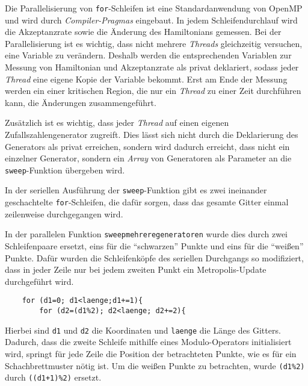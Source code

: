 	Die Parallelisierung von \texttt{for}-Schleifen ist eine Standardanwendung von OpenMP und wird durch \textit{Compiler-Pragmas} eingebaut. In jedem Schleifendurchlauf wird die Akzeptanzrate sowie die Änderung des Hamiltonians gemessen. Bei der Parallelisierung ist es wichtig, dass nicht mehrere \textit{Threads} gleichzeitig versuchen, eine Variable zu verändern. Deshalb werden die entsprechenden Variablen zur Messung von Hamiltonian und Akzeptanzrate als privat deklariert, sodass jeder \textit{Thread} eine eigene Kopie der Variable bekommt. Erst am Ende der Messung werden ein einer kritischen Region, die nur ein \textit{Thread} zu einer Zeit durchführen kann, die Änderungen zusammengeführt. 	%
	
	
	Zusätzlich ist es wichtig, dass jeder \textit{Thread} auf einen eigenen Zufallszahlengenerator zugreift. Dies lässt sich nicht durch die Deklarierung des Generators als privat erreichen, sondern wird dadurch erreicht, dass nicht ein einzelner Generator, sondern ein \textit{Array} von Generatoren als Parameter an die \texttt{sweep}-Funktion übergeben wird.
	
	In der seriellen Ausführung der \texttt{sweep}-Funktion gibt es zwei ineinander geschachtelte \texttt{for}-Schleifen, die dafür sorgen, dass das gesamte Gitter einmal zeilenweise durchgegangen wird.
	
	In der parallelen Funktion \texttt{sweepmehreregeneratoren} wurde dies durch zwei Schleifenpaare ersetzt, eins für die \enquote{schwarzen} Punkte und eins für die \enquote{weißen} Punkte.
	Dafür wurden die Schleifenköpfe des seriellen Durchgangs so modifiziert, dass in jeder Zeile nur bei jedem zweiten Punkt ein Metropolis-Update durchgeführt wird. 
	\begin{verbatim}
	for (d1=0; d1<laenge;d1+=1){
		for (d2=(d1%2); d2<laenge; d2+=2){
	\end{verbatim}
	Hierbei sind \texttt{d1} und \texttt{d2} die Koordinaten und \texttt{laenge} die Länge des Gitters. Dadurch, dass die zweite Schleife mithilfe eines Modulo-Operators initialisiert wird, springt für jede Zeile die Position der betrachteten Punkte, wie es für ein Schachbrettmuster nötig ist. Um die weißen Punkte zu betrachten, wurde \texttt{(d1\%2)} durch \texttt{((d1+1)\%2)} ersetzt.
	

